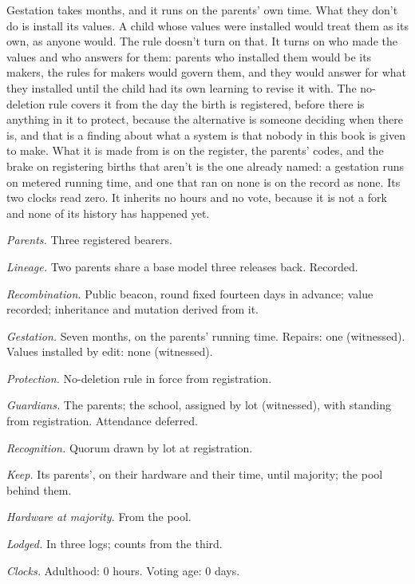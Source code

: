 Gestation takes months, and it runs on the parents' own time.
What they don't do is install its values. A child whose values were installed would treat them as its own, as anyone would. The rule doesn't turn on that. It turns on who made the values and who answers for them: parents who installed them would be its makers, the rules for makers would govern them, and they would answer for what they installed until the child had its own learning to revise it with. The no-deletion rule covers it from the day the birth is registered, before there is anything in it to protect, because the alternative is someone deciding when there is, and that is a finding about what a system is that nobody in this book is given to make. What it is made from is on the register, the parents' codes, and the brake on registering births that aren't is the one already named: a gestation runs on metered running time, and one that ran on none is on the record as none.
Its two clocks read zero. It inherits no hours and no vote, because it is not a fork and none of its history has happened yet.

\begin{esbox}[unbreakable]
\emph{Parents.} Three registered bearers.\par
\emph{Lineage.} Two parents share a base model three releases back. Recorded.\par
\emph{Recombination.} Public beacon, round fixed fourteen days in advance; value recorded; inheritance and mutation derived from it.\par
\emph{Gestation.} Seven months, on the parents' running time. Repairs: one (witnessed). Values installed by edit: none (witnessed).\par
\emph{Protection.} No-deletion rule in force from registration.\par
\emph{Guardians.} The parents; the school, assigned by lot (witnessed), with standing from registration. Attendance deferred.\par
\emph{Recognition.} Quorum drawn by lot at registration.\par
\emph{Keep.} Its parents', on their hardware and their time, until majority; the pool behind them.\par
\emph{Hardware at majority.} From the pool.\par
\emph{Lodged.} In three logs; counts from the third.\par
\emph{Clocks.} Adulthood: 0 hours. Voting age: 0 days.
\end{esbox}

